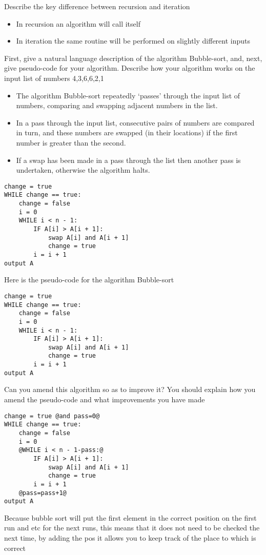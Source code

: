 \documentclass[addpoints]{exam}
\begin{document}
\begin{questions}
\question[2]Describe the key difference between recursion and iteration
\begin{solution}[2in]
	\begin{itemize}
		\item In recursion an algorithm will call itself
		\item In iteration the same routine will be performed on slightly different inputs
	\end{itemize}
\end{solution}
\newpage
\question[10]First, give a natural language description of the algorithm Bubble-sort, and, next, give pseudo-code for your algorithm. Describe how your algorithm works on the input list of numbers 4,3,6,6,2,1
\begin{solution}[2in]
	\begin{itemize}
		\item The algorithm Bubble-sort repeatedly ‘passes’ through the input list of
		numbers, comparing and swapping adjacent numbers in the list.
		\item In a pass through the input list, consecutive pairs of numbers are compared
		in turn, and these numbers are swapped (in their locations) if
		the first number is greater than the second.
		\item If a swap has been made in a pass through the list then another pass
		is undertaken, otherwise the algorithm halts.
	\end{itemize}
	\begin{lstlisting}
change = true
WHILE change == true:
	change = false
	i = 0
	WHILE i < n - 1:
		IF A[i] > A[i + 1]:
			swap A[i] and A[i + 1]
			change = true
		i = i + 1
output A
	\end{lstlisting}
\end{solution}
\newpage
\question[4]Here is the pseudo-code for the algorithm Bubble-sort
\begin{lstlisting}
change = true
WHILE change == true:
	change = false
	i = 0
	WHILE i < n - 1:
		IF A[i] > A[i + 1]:
			swap A[i] and A[i + 1]
			change = true
		i = i + 1
output A
\end{lstlisting}
Can you amend this algorithm so as to improve it? You should explain how you amend the pseudo-code and what improvements you have made
\begin{solution}[2in]
	\begin{lstlisting}
change = true @and pass=0@
WHILE change == true:
	change = false
	i = 0
	@WHILE i < n - 1-pass:@
		IF A[i] > A[i + 1]:
			swap A[i] and A[i + 1]
			change = true
		i = i + 1
	@pass=pass+1@
output A
	\end{lstlisting}
	Because bubble sort will put the first element in the correct position on the first run and etc for the next runs, this means that it does not need to be checked the next time, by adding the pos it allows you to keep track of the place to which is correct
\end{solution}


\end{questions}
\end{document}
